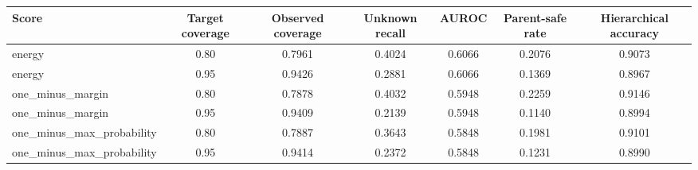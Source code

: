 \begin{tabular}{lcccccc}
\toprule
Score & Target coverage & Observed coverage & Unknown recall & AUROC & Parent-safe rate & Hierarchical accuracy \\
\midrule
energy & 0.80 & 0.7961 & 0.4024 & 0.6066 & 0.2076 & 0.9073 \\
energy & 0.95 & 0.9426 & 0.2881 & 0.6066 & 0.1369 & 0.8967 \\
one\_minus\_margin & 0.80 & 0.7878 & 0.4032 & 0.5948 & 0.2259 & 0.9146 \\
one\_minus\_margin & 0.95 & 0.9409 & 0.2139 & 0.5948 & 0.1140 & 0.8994 \\
one\_minus\_max\_probability & 0.80 & 0.7887 & 0.3643 & 0.5848 & 0.1981 & 0.9101 \\
one\_minus\_max\_probability & 0.95 & 0.9414 & 0.2372 & 0.5848 & 0.1231 & 0.8990 \\
\bottomrule
\end{tabular}
